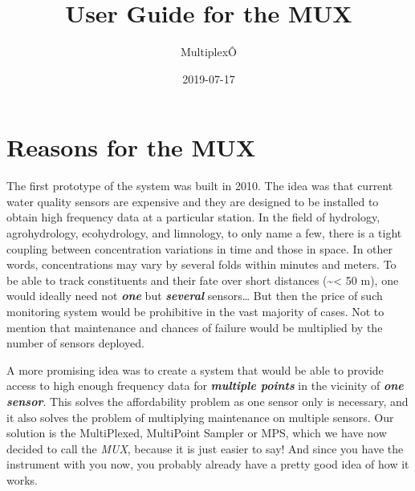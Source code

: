 \documentclass[]{book}
\title{User Guide for the MUX}
\author{MultiplexÔ}
\date{2019-07-17}
\begin{document}
\maketitle

{
\setcounter{tocdepth}{1}
\tableofcontents
}
\hypertarget{reasons-for-the-mux}{%
\chapter{Reasons for the MUX}\label{reasons-for-the-mux}}

The first prototype of the system was built in 2010. The idea was that current water quality sensors are expensive and they are designed to be installed to obtain high frequency data at a particular station. In the field of hydrology, agrohydrology, ecohydrology, and limnology, to only name a few, there is a tight coupling between concentration variations in time and those in space. In other words, concentrations may vary by several folds within minutes and meters. To be able to track constituents and their fate over short distances (\textasciitilde{}\textless{} 50 m), one would ideally need not \emph{\textbf{one}} but \emph{\textbf{several}} sensors\ldots{} But then the price of such monitoring system would be prohibitive in the vast majority of cases. Not to mention that maintenance and chances of failure would be multiplied by the number of sensors deployed.

A more promising idea was to create a system that would be able to provide access to high enough frequency data for \emph{\textbf{multiple points}} in the vicinity of \emph{\textbf{one sensor}}. This solves the affordability problem as one sensor only is necessary, and it also solves the problem of multiplying maintenance on multiple sensors. Our solution is the MultiPlexed, MultiPoint Sampler or MPS, which we have now decided to call the \emph{MUX}, because it is just easier to say! And since you have the instrument with you now, you probably already have a pretty good idea of how it works.
\end{document}
